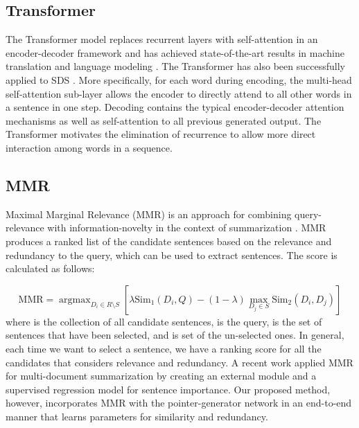 \documentclass[11pt,a4paper]{article}
\makeatletter
\DeclareMathOperator*{\argmax}{argmax} \newcommand{\specialcell}[2][c]{\begin{tabular}[#1]{@{}c@{}}#2\end{tabular}}
\makeatother
\begin{document}
\subsection{Transformer}
The Transformer model replaces recurrent layers with self-attention in an encoder-decoder framework and has achieved state-of-the-art results in machine translation \cite{vaswani2017attention} and language modeling \cite{baevski2018adaptive, dai2019transformerxl}. The Transformer has also been successfully applied to SDS \cite{Gehrmann:18}. More specifically, for each word during encoding, the multi-head self-attention sub-layer allows the encoder to directly attend to all other words in a sentence in one step. Decoding contains the typical encoder-decoder attention mechanisms as well as self-attention to all previous generated output. The Transformer motivates the elimination of recurrence to allow more direct interaction among words in a sequence. 




\subsection{MMR}
Maximal Marginal Relevance (MMR) is an approach for combining query-relevance with information-novelty in the context of summarization \cite{carbonell1998use}. MMR produces a ranked list of the candidate sentences based on the relevance and redundancy to the query, which can be used to extract sentences. The score is calculated as follows: 



\begin{dmath} 
\label{eq:mmr}
{\text{MMR}}=\argmax_{ D_{ i }\in R\setminus S }  \left[ \lambda { \text{Sim} }_{ 1 } (D_{ i },Q)-(1-\lambda )\max _{ D_{ j }\in S }{ \text{Sim}_2 }(D_{ i },D_{ j } ) \right]
\end{dmath}
where  is the collection of all candidate sentences,  is the query,  is the set of sentences that have been selected, and  is set of the un-selected ones. In general, each time we want to select a sentence, we have a ranking score for all the candidates that considers relevance and redundancy. 
A recent work \cite{lebanoff18mds} applied MMR for multi-document summarization by creating an external module and a supervised regression model for sentence importance. Our proposed method, however, incorporates MMR with the pointer-generator network in an end-to-end manner that learns parameters for similarity and redundancy. 
\end{document}
